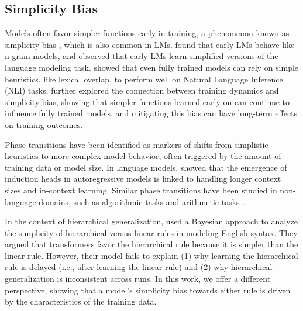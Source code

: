 \subsection{Simplicity Bias}
Models often favor simpler functions early in training, a phenomenon known as simplicity bias \citep{Hermann2020-ja}, which is also common in LMs. \citet{Choshen2022-qj} found that early LMs behave like n-gram models, and \citet{Saphra2019-sq} observed that early LMs learn simplified versions of the language modeling task. \citet{McCoy2019-br} showed that even fully trained models can rely on simple heuristics, like lexical overlap, to perform well on Natural Language Inference (NLI) tasks. \citet{Chen2023-fi} further explored the connection between training dynamics and simplicity bias, showing that simpler functions learned early on can continue to influence fully trained models, and mitigating this bias can have long-term effects on training outcomes.


Phase transitions have been identified as markers of shifts from simplistic heuristics to more complex model behavior, often triggered by the amount of training data or model size. In language models, \citet{Olsson2022-ed} showed that the emergence of induction heads in autoregressive models is linked to handling longer context sizes and in-context learning. Similar phase transitions have been studied in non-language domains, such as algorithmic tasks \citep{Power2022-hz, Merrill2023-an} and arithmetic tasks \citep{Nanda2023-zm, Barak2022-ub}.


In the context of hierarchical generalization, \citet{Ahuja2024-ul} used a Bayesian approach to analyze the simplicity of hierarchical versus linear rules in modeling English syntax. They argued that transformers favor the hierarchical rule because it is simpler than the linear rule. However, their model fails to explain (1) why learning the hierarchical rule is delayed (i.e., after learning the linear rule) and (2) why hierarchical generalization is inconsistent across runs. In this work, we offer a different perspective, showing that a model's simplicity bias towards either rule is driven by the characteristics of the training data.

